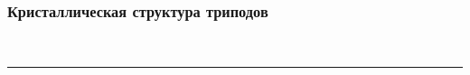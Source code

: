 \begin{frame}
	\frametitle{Кристаллическая структура триподов}
	\centering
	\begin{minipage}[t]{0.25\linewidth}
	\end{minipage}
	\begin{minipage}[t]{0.25\linewidth}
	\end{minipage}
	\\
	\begin{minipage}[t]{0.15\linewidth}
	\end{minipage}
	\begin{minipage}[t]{0.15\linewidth}
	\end{minipage}
	\begin{minipage}[t]{0.15\linewidth}
	\end{minipage}
	\begin{minipage}[t]{0.15\linewidth}
	\end{minipage}
	\begin{minipage}[t]{0.15\linewidth}
	\end{minipage}
	\bigskip
	\hrule{}
	\bigskip
	\begin{minipage}[t]{0.25\linewidth}
	\end{minipage}
	\begin{minipage}[t]{0.25\linewidth}
	\end{minipage}
	\\
	\begin{minipage}[t]{0.2\linewidth}
	\end{minipage}
	\begin{minipage}[t]{0.2\linewidth}
	\end{minipage}
	\begin{minipage}[t]{0.2\linewidth}
	\end{minipage}
\end{frame}

